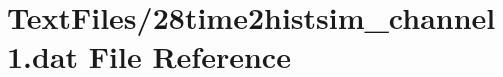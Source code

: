 \hypertarget{28time2histsim__channel1_8dat}{}\section{Text\+Files/28time2histsim\+\_\+channel1.dat File Reference}
\label{28time2histsim__channel1_8dat}
